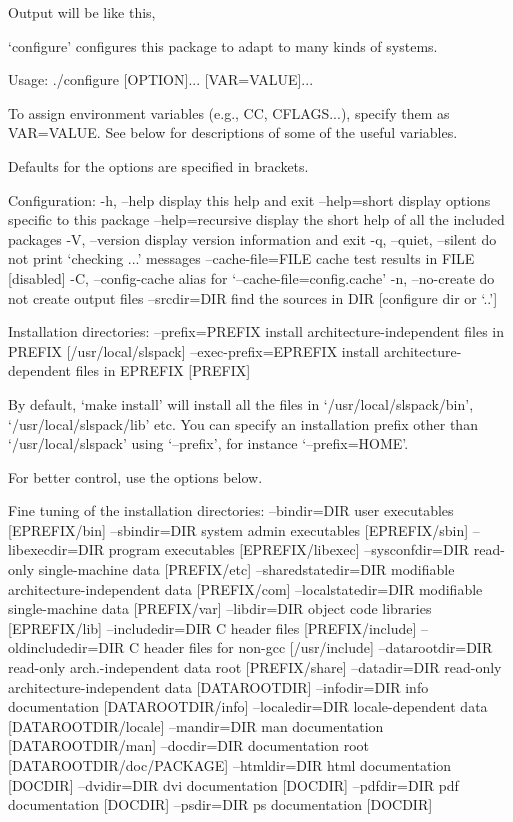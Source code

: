 Output will be like this,
\begin{evb}
`configure' configures this package to adapt to many kinds of systems.

Usage: ./configure [OPTION]... [VAR=VALUE]...

To assign environment variables (e.g., CC, CFLAGS...), specify them as
VAR=VALUE.  See below for descriptions of some of the useful variables.

Defaults for the options are specified in brackets.

Configuration:
  -h, --help              display this help and exit
      --help=short        display options specific to this package
      --help=recursive    display the short help of all the included packages
  -V, --version           display version information and exit
  -q, --quiet, --silent   do not print `checking ...' messages
      --cache-file=FILE   cache test results in FILE [disabled]
  -C, --config-cache      alias for `--cache-file=config.cache'
  -n, --no-create         do not create output files
      --srcdir=DIR        find the sources in DIR [configure dir or `..']

Installation directories:
  --prefix=PREFIX         install architecture-independent files in PREFIX
                          [/usr/local/slspack]
  --exec-prefix=EPREFIX   install architecture-dependent files in EPREFIX
                          [PREFIX]

By default, `make install' will install all the files in
`/usr/local/slspack/bin', `/usr/local/slspack/lib' etc.  You can specify
an installation prefix other than `/usr/local/slspack' using `--prefix',
for instance `--prefix=HOME'.

For better control, use the options below.

Fine tuning of the installation directories:
  --bindir=DIR            user executables [EPREFIX/bin]
  --sbindir=DIR           system admin executables [EPREFIX/sbin]
  --libexecdir=DIR        program executables [EPREFIX/libexec]
  --sysconfdir=DIR        read-only single-machine data [PREFIX/etc]
  --sharedstatedir=DIR    modifiable architecture-independent data [PREFIX/com]
  --localstatedir=DIR     modifiable single-machine data [PREFIX/var]
  --libdir=DIR            object code libraries [EPREFIX/lib]
  --includedir=DIR        C header files [PREFIX/include]
  --oldincludedir=DIR     C header files for non-gcc [/usr/include]
  --datarootdir=DIR       read-only arch.-independent data root [PREFIX/share]
  --datadir=DIR           read-only architecture-independent data [DATAROOTDIR]
  --infodir=DIR           info documentation [DATAROOTDIR/info]
  --localedir=DIR         locale-dependent data [DATAROOTDIR/locale]
  --mandir=DIR            man documentation [DATAROOTDIR/man]
  --docdir=DIR            documentation root [DATAROOTDIR/doc/PACKAGE]
  --htmldir=DIR           html documentation [DOCDIR]
  --dvidir=DIR            dvi documentation [DOCDIR]
  --pdfdir=DIR            pdf documentation [DOCDIR]
  --psdir=DIR             ps documentation [DOCDIR]


\end{evb}
